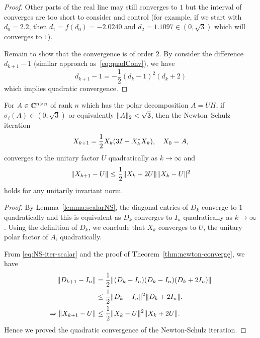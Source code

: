 \documentclass[12pt]{article}
\begin{document}
\begin{proof}
    Other parts of the real line may still converges to $1$ but the interval of converges are too short to consider and control (for example, if we start with $d_0 = 2.2$, then $d_1 = f(d_0) = -2.0240$ and $d_2 = 1.1097 \in (0,\sqrt{3})$ which will converges to $1$).

    Remain to show that the convergence is of order $2$. By consider the difference $d_{k+1} - 1$ (similar approach as~\eqref{eq:quadConv}), we have 
    \begin{equation}\label{eq:NS-iter-scalar}
        d_{k+1} - 1 = -\frac 12 (d_k-1)^2 (d_k + 2)
    \end{equation}
    which implies quadratic convergence.
\end{proof}

\begin{theorem}
    \label{thm:newtonSchulzConverge}
    For $A\in\mathbb{C}^{n\times n}$ of rank $n$ which has the polar decomposition $A = UH$, if $\sigma_i(A) \in (0,\sqrt{3})$ or equivalently $\|{A}\|_2 < \sqrt{3}$, then the Newton--Schulz iteration 
    \begin{equation}\notag
        X_{k+1} = \frac 12 X_k(3I-X_k^* X_k),\quad X_0 = A,
    \end{equation}
    converges to the unitary factor $U$ quadratically as $k\to\infty$ and 
    \begin{equation}\label{eq:NSconv}
        \|{X_{k+1} - U}\| \leq \frac 12 \|{X_k + 2U}\| \|{X_k - U}\|^2
    \end{equation}
    holds for any unitarily invariant norm.
\end{theorem}

\begin{proof}
    By Lemma~\ref{lemma:scalarNS}, the diagonal entries of $D_k$ converge to $1$ quadratically and this is equivalent as $D_k$ converges to $I_n$ quadratically as $k\to\infty$. Using the definition of $D_k$, we conclude that $X_k$ converges to $U$, the unitary polar factor of $A$, quadratically.

    From \eqref{eq:NS-iter-scalar} and the proof of Theorem~\ref{thm:newton-converge}, we have 
    \begin{equation}
        \notag 
        \begin{aligned}
            \|{D_{k+1} - I_n}\| &= \frac{1}{2}\|{(D_k - I_n)(D_k - I_n)(D_k + 2I_n)}\| \\
            & \leq \frac{1}{2}\|{D_k - I_n}\|^2 \|{D_k + 2I_n}\|.\\
            \Rightarrow 
            \|{X_{k+1} - U}\| &\leq \frac{1}{2} \|{X_k - U}\|^2 \|{X_k + 2U}\|.
        \end{aligned}
    \end{equation}
    Hence we proved the quadratic convergence of the Newton-Schulz iteration.
\end{proof}
\end{document}
